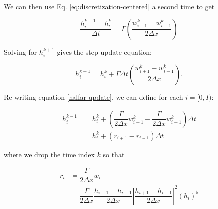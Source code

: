 \documentclass{article}
\begin{document}
\noindent We can then use Eq. \ref{eq:discretization-centered} a second time to
get


\begin{equation}\label{halfar-step-3}
    \dfrac{h_i^{k+1}-h_i^k}{\Delta t} = \Gamma \left(\dfrac{w_{i+1}^k-w_{i-1}^k}{2\Delta x}\right)
\end{equation}

\noindent Solving for $h_i^{k+1}$ gives the step update equation:


\begin{equation}\label{halfar-update}
    h_i^{k+1} = h_i^k + \Gamma \Delta t  \left(\dfrac{w_{i+1}^k-w_{i-1}^k}{2\Delta x}\right).
\end{equation}


\noindent Re-writing equation \ref{halfar-update}, we can define for each $i
    =[0, I)$:

\begin{equation}\label{halfar-petri-update}
    \begin{split}
        h_i^{k+1} &= h_i^k + \left(\dfrac{\Gamma }{2\Delta x}w_{i+1}^k -\dfrac{\Gamma }{2\Delta x}w_{i-1}^k\right)\Delta t\\
        &= h_i^k + (r_{i+1} - r_{i-1}) \Delta t
    \end{split}
\end{equation}

\noindent where we drop the time index $k$ so that

\begin{equation}\label{halfar-petri-rates}
    \begin{split}
        r_i &= \dfrac{\Gamma}{2\Delta x}w_i\\
        &= \dfrac{\Gamma}{2\Delta x}\dfrac{h_{i+1}-h_{i-1}}{2\Delta x} \left|\dfrac{h_{i+1}-h_{i-1}}{2\Delta x}\right|^2(h_i)^5
    \end{split}
\end{equation}
\end{document}
